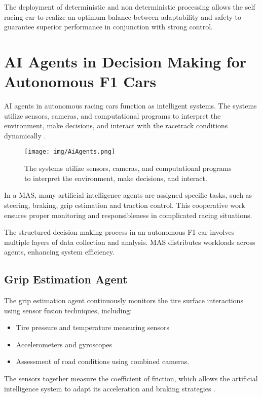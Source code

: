 \documentclass[a4paper,final,12pt]{report}
\begin{document}
The deployment of deterministic and non deterministic processing allows the self racing car to realize an optimum balance between adaptability and safety to guarantee superior performance in conjunction with strong control.

\section{AI Agents in Decision Making for Autonomous F1 Cars}
AI agents in autonomous racing cars function as intelligent systems. The systems utilize sensors, cameras, and computational programs to interpret the environment, make decisions, and interact with the racetrack conditions dynamically \cite{allaboutai}.

\begin{figure}[hbtp]
\centering
\texttt{[image: img/AiAgents.png]}
\caption{The systems utilize sensors, cameras, and computational programs to interpret the environment, make decisions, and interact. \cite{allaboutai}}
\label{figura:AIAgent}
\end{figure}

In a MAS, many artificial intelligence agents are assigned specific tasks, such as steering, braking, grip estimation and traction control. This cooperative work ensures proper monitoring and responsibleness in complicated racing situations.

The structured decision making process in an autonomous F1 car involves multiple layers of data collection and analysis. MAS distributes workloads across agents, enhancing system efficiency.

\subsection{Grip Estimation Agent}
The grip estimation agent continuously monitors the tire surface interactions using sensor fusion techniques, including:
\begin{itemize}
    \item Tire pressure and temperature measuring sensors
    \item Accelerometers and gyroscopes
    \item Assessment of road conditions using combined cameras.
\end{itemize}
The sensors together measure the coefficient of friction, which allows the artificial intelligence system to adapt its acceleration and braking strategies \cite{toyota_research}.
\end{document}
